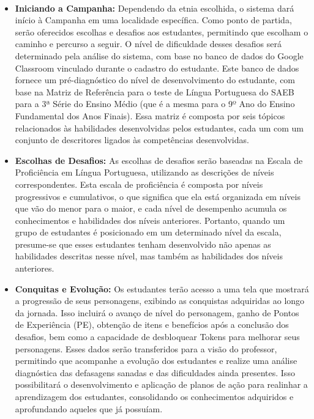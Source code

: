 \\
\begin{itemize}
\\
  \item \textbf{Iniciando a Campanha:} Dependendo da etnia escolhida, o sistema dará início à Campanha em uma localidade específica. Como ponto de partida, serão oferecidos escolhas e desafios aos estudantes, permitindo que escolham o caminho e percurso a seguir. O nível de dificuldade desses desafios será determinado pela análise do sistema, com base no banco de dados do Google Classroom vinculado durante o cadastro do estudante. Este banco de dados fornece um pré-diagnóstico do nível de desenvolvimento do estudante, com base na Matriz de Referência para o teste de Língua Portuguesa do SAEB para a 3ª Série do Ensino Médio (que é a mesma para o 9º Ano do Ensino Fundamental dos Anos Finais). Essa matriz é composta por seis tópicos relacionados às habilidades desenvolvidas pelos estudantes, cada um com um conjunto de descritores ligados às competências desenvolvidas. 
\\
 \item \textbf{Escolhas de Desafios:} As escolhas de desafios serão baseadas na Escala de Proficiência em Língua Portuguesa, utilizando as descrições de níveis correspondentes. Esta escala de proficiência é composta por níveis progressivos e cumulativos, o que significa que ela está organizada em níveis que vão do menor para o maior, e cada nível de desempenho acumula os conhecimentos e habilidades dos níveis anteriores. Portanto, quando um grupo de estudantes é posicionado em um determinado nível da escala, presume-se que esses estudantes tenham desenvolvido não apenas as habilidades descritas nesse nível, mas também as habilidades dos níveis anteriores. 
\\
\item \textbf{Conquitas e Evolução:} Os estudantes terão acesso a uma tela que mostrará a progressão de seus personagens, exibindo as conquistas adquiridas ao longo da jornada. Isso incluirá o avanço de nível do personagem, ganho de Pontos de Experiência (PE), obtenção de itens e benefícios após a conclusão dos desafios, bem como a capacidade de desbloquear Tokens para melhorar seus personagens. Esses dados serão transferidos para a visão do professor, permitindo que acompanhe a evolução dos estudantes e realize uma análise diagnóstica das defasagens sanadas e das dificuldades ainda presentes. Isso possibilitará o desenvolvimento e aplicação de planos de ação para realinhar a aprendizagem dos estudantes, consolidando os conhecimentos adquiridos e aprofundando aqueles que já possuíam. 

\end{itemize}
